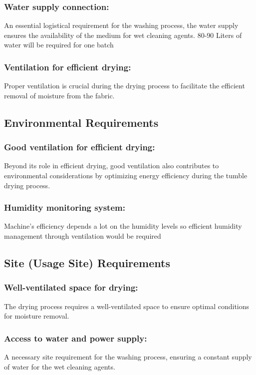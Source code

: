 \documentclass[12pt]{article} %
\begin{document}
  \subsubsection{Water supply connection:} An essential logistical requirement for the washing process, the water supply ensures the availability of the medium for \gls{wet cleaning agent}s. 80-90 Liters of water will be required for one batch

  
  \subsubsection{Ventilation for efficient drying:} Proper ventilation is crucial during the drying process to facilitate the efficient removal of moisture from the fabric. 


\subsection{Environmental Requirements}

 \subsubsection{Good ventilation for efficient drying:} Beyond its role in efficient drying, good ventilation also contributes to environmental considerations by optimizing energy efficiency during the \gls{tumble drying process}.

 
 \subsubsection{Humidity monitoring system:} Machine’s efficiency depends a lot on the humidity levels so efficient humidity management through ventilation would be required


\subsection{Site (Usage Site) Requirements}

 \subsubsection{Well-ventilated space for drying:} The drying process requires a well-ventilated space to ensure optimal conditions for moisture removal.
 
 \subsubsection{Access to water and power supply:} A necessary site requirement for the washing process, ensuring a constant supply of water for the \gls{wet cleaning agent}s.
 
\end{document}
